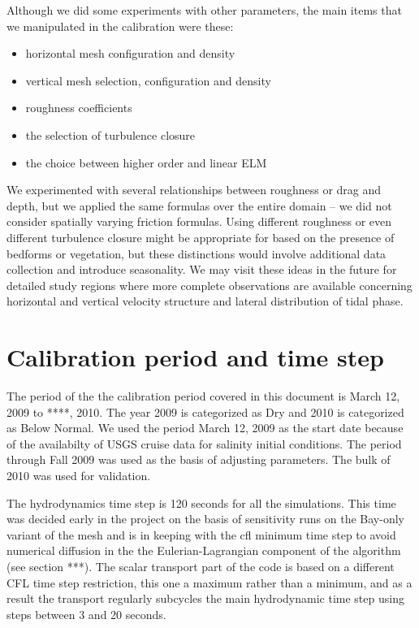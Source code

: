 Although we did some experiments with other parameters, the main items that we manipulated in the calibration were these:
\begin{itemize}
	\item horizontal mesh configuration and density
	\item vertical mesh selection, configuration and density
	\item roughness coefficients
	\item the selection of turbulence closure
	\item the choice between higher order and linear ELM
\end{itemize}

We experimented with several relationships between roughness or drag and depth, but we applied the same formulas
over the entire domain -- we did not consider spatially varying friction formulas. 
Using different roughness or even different turbulence closure might be appropriate for based
on the presence of bedforms or vegetation, but these distinctions would involve additional data collection and 
introduce seasonality. We may visit these ideas in the future for detailed study regions where more complete observations are available concerning horizontal and vertical velocity structure and lateral distribution of tidal phase.


\section{Calibration period and time step}
The period of the the calibration period covered in this document is March 12, 2009 to ****, 2010. The year 2009 is categorized as Dry and 2010 is categorized as Below Normal. We used the period March 12, 2009 as the start date because of the availabilty of USGS cruise data for salinity initial conditions.
The period through Fall 2009 was used as the basis of adjusting parameters. The bulk of 2010 was used for validation.

The hydrodynamics time step is 120 seconds for all the simulations. This time was decided early in the project on the basis of sensitivity runs on the Bay-only variant of the mesh and is in keeping with the 
\gls{cfl} minimum time step to avoid numerical diffusion in the the Eulerian-Lagrangian 
component of the algorithm (see section ***). The scalar transport 
part of the code is based on a different CFL time step restriction, this one a maximum rather than a minimum, 
and as a result the transport regularly subcycles the main hydrodynamic time step using steps between 3 and 20 seconds.

